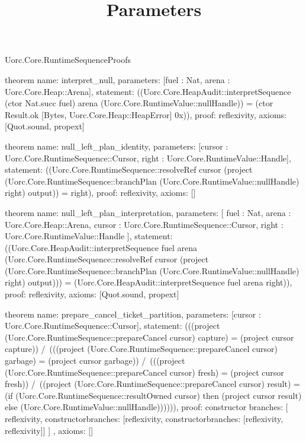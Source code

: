 \begin{lexlean}{Uorc.Core.RuntimeSequenceProofs}
\title{Parameters}
\begin{semanticmodule}
theorem{
  name: interpret_null,
  parameters: [fuel : Nat, arena : Uorc.Core.Heap::Arena],
  statement: ((Uorc.Core.HeapAudit::interpretSequence (ctor Nat.succ fuel) arena (Uorc.Core.RuntimeValue::nullHandle)) = (ctor Result.ok [Bytes, Uorc.Core.Heap::HeapError] 0x)),
  proof: reflexivity{},
  axioms: [Quot.sound, propext]
}

theorem{
  name: null_left_plan_identity,
  parameters: [cursor : Uorc.Core.RuntimeSequence::Cursor, right : Uorc.Core.RuntimeValue::Handle],
  statement: ((Uorc.Core.RuntimeSequence::resolveRef cursor (project (Uorc.Core.RuntimeSequence::branchPlan (Uorc.Core.RuntimeValue::nullHandle) right) output)) = right),
  proof: reflexivity{},
  axioms: []
}

theorem{
  name: null_left_plan_interpretation,
  parameters: [
    fuel : Nat,
    arena : Uorc.Core.Heap::Arena,
    cursor : Uorc.Core.RuntimeSequence::Cursor,
    right : Uorc.Core.RuntimeValue::Handle
  ],
  statement: ((Uorc.Core.HeapAudit::interpretSequence fuel arena (Uorc.Core.RuntimeSequence::resolveRef cursor (project (Uorc.Core.RuntimeSequence::branchPlan (Uorc.Core.RuntimeValue::nullHandle) right) output))) = (Uorc.Core.HeapAudit::interpretSequence fuel arena right)),
  proof: reflexivity{},
  axioms: [Quot.sound, propext]
}

theorem{
  name: prepare_cancel_ticket_partition,
  parameters: [cursor : Uorc.Core.RuntimeSequence::Cursor],
  statement: (((project (Uorc.Core.RuntimeSequence::prepareCancel cursor) capture) = (project cursor capture)) /\ (((project (Uorc.Core.RuntimeSequence::prepareCancel cursor) garbage) = (project cursor garbage)) /\ (((project (Uorc.Core.RuntimeSequence::prepareCancel cursor) fresh) = (project cursor fresh)) /\ ((project (Uorc.Core.RuntimeSequence::prepareCancel cursor) result) = (if (Uorc.Core.RuntimeSequence::resultOwned cursor) then (project cursor result) else (Uorc.Core.RuntimeValue::nullHandle)))))),
  proof: constructor{
    branches: [
      reflexivity{},
      constructor{branches: [reflexivity{}, constructor{branches: [reflexivity{}, reflexivity{}]}]}
    ]
  },
  axioms: []
}


\end{semanticmodule}
\end{lexlean}
